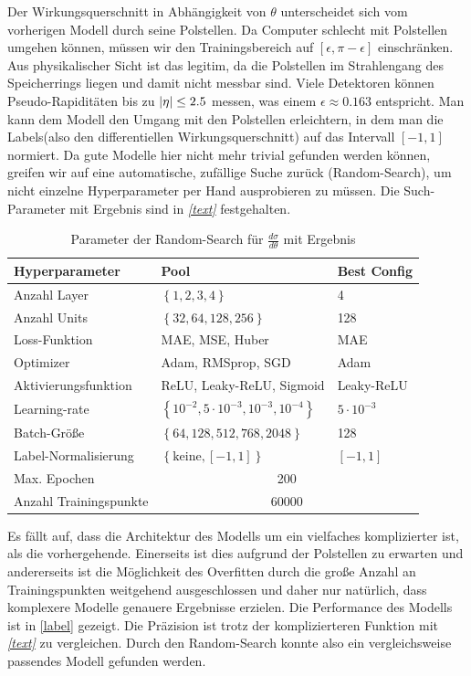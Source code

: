 Der Wirkungsquerschnitt in Abhängigkeit von $\theta$ unterscheidet sich vom vorherigen Modell durch seine Polstellen. Da Computer schlecht mit Polstellen umgehen können, müssen wir den Trainingsbereich auf $[\epsilon, \pi-\epsilon]$ einschränken. Aus physikalischer Sicht ist das legitim, da die Polstellen im Strahlengang des Speicherrings liegen und damit nicht messbar sind. Viele Detektoren können Pseudo-Rapiditäten bis zu $\abs{\eta} \leq 2.5$ messen, was einem $\epsilon \approx 0.163$ entspricht. Man kann dem Modell den Umgang mit den Polstellen erleichtern, in dem man die Labels(also den differentiellen Wirkungsquerschnitt) auf das Intervall $[-1, 1]$ normiert. Da gute Modelle hier nicht mehr trivial gefunden werden können, greifen wir auf eine automatische, zufällige Suche zurück (Random-Search), um nicht einzelne Hyperparameter per Hand ausprobieren zu müssen. Die Such-Parameter mit Ergebnis sind in \textit{\autoref{text}} festgehalten.
\begin{table}
	\centering
	\begin{tabular}{|l|l|l|}
		\hline
		Hyperparameter & Pool & Best Config \\
		\hline
		Anzahl Layer & $\left\lbrace 1, 2, 3, 4 \right\rbrace$ & 4 \\
		Anzahl Units & $\left\lbrace 32, 64, 128, 256\right\rbrace$ & 128 \\
		Loss-Funktion & MAE, MSE, Huber & MAE \\
		Optimizer & Adam, RMSprop, SGD  & Adam\\
		Aktivierungsfunktion & ReLU, Leaky-ReLU, Sigmoid & Leaky-ReLU \\
		Learning-rate & $\left\lbrace 10^{-2}, 5 \cdot 10^{-3}, 10^{-3}, 10^{-4} \right\rbrace $ & $5 \cdot 10^{-3}$\\
		Batch-Größe & $\left\lbrace 64, 128, 512, 768, 2048 \right\rbrace $ & 128\\
		Label-Normalisierung & $\left\lbrace \text{keine}, [-1,1]\right\rbrace $ & $[-1,1]$\\
		\hline
		Max. Epochen & \multicolumn{2}{c|}{200}\\
		Anzahl Trainingspunkte & \multicolumn{2}{c|}{60000} \\
		\hline
	\end{tabular}
	\caption{Parameter der Random-Search für $\frac{d\sigma}{d\theta}$ mit Ergebnis}
\end{table}
Es fällt auf, dass die Architektur des Modells um ein vielfaches komplizierter ist, als die vorhergehende. Einerseits ist dies aufgrund der Polstellen zu erwarten und andererseits ist die Möglichkeit des Overfitten durch die große Anzahl an Trainingspunkten weitgehend ausgeschlossen und daher nur natürlich, dass komplexere Modelle genauere Ergebnisse erzielen. Die Performance des Modells ist in \textit{}\autoref{label} gezeigt. Die Präzision ist trotz der komplizierteren Funktion mit \textit{\autoref{text}} zu vergleichen. Durch den Random-Search konnte also ein vergleichsweise passendes Modell gefunden werden. 
